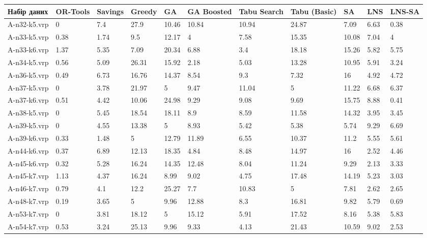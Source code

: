 \begin{table}[!ht]
    \centering
    \begin{tabular}{|l|l|l|l|l|l|l|l|l|l|l|}
    \hline
        Набір даних & OR-Tools & Savings & Greedy & GA & GA Boosted & Tabu Search & Tabu (Basic) & SA & LNS & LNS-SA \\ \hline
        A-n32-k5.vrp & 0 & 7.4 & 27.9 & 10.46 & 10.84 & 10.94 & 24.87 & 7.09 & 6.63 & 0.38 \\ \hline
        A-n33-k5.vrp & 0.38 & 1.74 & 9.5 & 12.17 & 4 & 7.58 & 15.35 & 10.08 & 7.04 & 4 \\ \hline
        A-n33-k6.vrp & 1.37 & 5.35 & 7.09 & 20.34 & 6.88 & 3.4 & 18.18 & 15.26 & 5.82 & 5.75 \\ \hline
        A-n34-k5.vrp & 0.56 & 5.09 & 26.31 & 15.92 & 2.18 & 5.03 & 13.28 & 10.95 & 5.91 & 3.24 \\ \hline
        A-n36-k5.vrp & 0.49 & 6.73 & 16.76 & 14.37 & 8.54 & 9.3 & 7.32 & 16 & 4.92 & 4.72 \\ \hline
        A-n37-k5.vrp & 0 & 3.78 & 21.97 & 5 & 9.47 & 11.04 & 5 & 11.22 & 6.68 & 6.37 \\ \hline
        A-n37-k6.vrp & 0.51 & 4.42 & 10.06 & 24.98 & 9.29 & 9.08 & 9.69 & 15.75 & 8.88 & 0.41 \\ \hline
        A-n38-k5.vrp & 0 & 5.45 & 18.54 & 18.11 & 8.9 & 8.59 & 11.58 & 14.32 & 3.95 & 3.45 \\ \hline
        A-n39-k5.vrp & 0 & 4.55 & 13.38 & 5 & 8.93 & 5.42 & 5.38 & 5.74 & 9.29 & 6.69 \\ \hline
        A-n39-k6.vrp & 0.33 & 1.48 & 5 & 12.79 & 11.89 & 6.55 & 10.37 & 11.2 & 5.55 & 5.61 \\ \hline
        A-n44-k6.vrp & 0.37 & 6.89 & 12.13 & 18.35 & 4.84 & 8.48 & 14.97 & 16 & 2.52 & 4.46 \\ \hline
        A-n45-k6.vrp & 0.32 & 5.28 & 16.24 & 14.35 & 12.48 & 8.04 & 11.24 & 9.29 & 2.13 & 3.33 \\ \hline
        A-n45-k7.vrp & 1.13 & 4.37 & 16.24 & 8.99 & 9.02 & 4.75 & 17.48 & 14.19 & 5.23 & 3.03 \\ \hline
        A-n46-k7.vrp & 0.79 & 4.1 & 12.2 & 25.27 & 7.7 & 10.83 & 5 & 7.81 & 2.62 & 2.65 \\ \hline
        A-n48-k7.vrp & 0.19 & 3.65 & 5 & 9.96 & 12.88 & 8.3 & 16.81 & 9.82 & 5.79 & 0.69 \\ \hline
        A-n53-k7.vrp & 0 & 3.81 & 18.12 & 5 & 15.12 & 5.91 & 17.52 & 8.16 & 5.38 & 5.83 \\ \hline
        A-n54-k7.vrp & 0.53 & 3.24 & 25.13 & 9.96 & 9.33 & 4.13 & 21.43 & 10.59 & 9.02 & 2.53 \\ \hline

\end{tabular}
\end{table}
